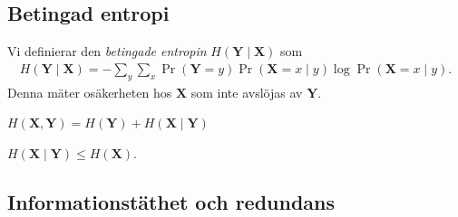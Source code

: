 \documentclass{beamer}
\let\stoch\mathbf{}
\begin{document}
\subsection{Betingad entropi}

\begin{frame}
  \begin{definition}
    Vi definierar den \emph{betingade entropin} \(H(\stoch Y\mid \stoch X)\) 
    som
    \begin{align*}
      H(\stoch Y\mid \stoch X) = %
        -\sum_y\sum_x \Pr(\stoch Y = y)\Pr(\stoch X = x\mid y)\log \Pr(\stoch 
        X = x\mid y).
    \end{align*}
    Denna mäter osäkerheten hos \(\stoch X\) som inte avslöjas av \(\stoch Y\).
  \end{definition}
\end{frame}

\begin{frame}
  \begin{theorem}
    \(H(\stoch X, \stoch Y) = H(\stoch Y) + H(\stoch X\mid \stoch Y)\)
  \end{theorem}
%
%
  \begin{corollary}
    \(H(\stoch X\mid \stoch Y) \leq H(\stoch X)\).
  \end{corollary}
\end{frame}
%
%

\subsection{Informationstäthet och redundans}
\end{document}

